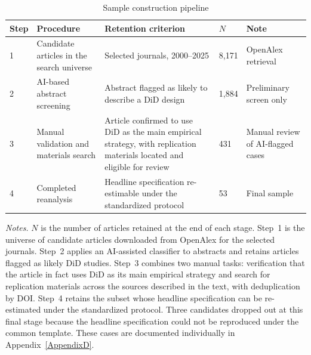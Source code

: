 \begin{table}[!htbp]
\centering
\caption{Sample construction pipeline}
\label{tab:sample_pipeline}
\begin{threeparttable}
\small
\begin{tabular}{p{.6cm} p{4cm} p{4.5cm} p{1cm} p{2.6cm}}
\toprule
\textbf{Step} & \textbf{Procedure} & \textbf{Retention criterion} & \textbf{$N$} & \textbf{Note} \\
\midrule
1 & Candidate articles in the search universe & Selected journals, 2000--2025 & 8,171 & OpenAlex retrieval \\
\midrule
2 & AI-based abstract screening & Abstract flagged as likely to describe a DiD design & 1,884 & Preliminary screen only \\
\midrule
3 & Manual validation and materials search & Article confirmed to use DiD as the main empirical strategy, with replication materials located and eligible for review & 431 & Manual review of AI-flagged cases \\
\midrule
4 & Completed reanalysis & Headline specification re-estimable under the standardized protocol & 53 & Final sample \\
\bottomrule
\end{tabular}
\begin{tablenotes}[flushleft]
\footnotesize
\item \textit{Notes.} $N$ is the number of articles retained at the end of each stage. Step~1 is the universe of candidate articles downloaded from OpenAlex for the selected journals. Step~2 applies an AI-assisted classifier to abstracts and retains articles flagged as likely DiD studies. Step~3 combines two manual tasks: verification that the article in fact uses DiD as its main empirical strategy and search for replication materials across the sources described in the text, with deduplication by DOI. Step~4 retains the subset whose headline specification can be re-estimated under the standardized protocol. Three candidates dropped out at this final stage because the headline specification could not be reproduced under the common template. These cases are documented individually in Appendix~\ref{AppendixD}.
\end{tablenotes}
\end{threeparttable}
\end{table}


